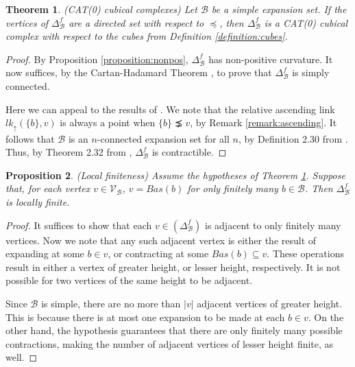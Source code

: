 \documentclass{amsart}
\newtheorem{theorem}{Theorem}[section]
\newtheorem{proposition}[theorem]{Proposition}
\newtheorem{standing assumption}[theorem]{Standing Assumption}
\begin{document}
\begin{theorem} \label{theorem:main} (CAT(0) cubical complexes)
Let $\mathcal{B}$ be a simple expansion set. If the vertices of $\Delta^{f}_{\mathcal{B}}$
are a directed set with respect to $\preceq$, then $\Delta^{f}_{\mathcal{B}}$ is 
a CAT(0) cubical complex with respect to the cubes from Definition \ref{definition:cubes}.
\end{theorem}

\begin{proof}
By Proposition \ref{proposition:nonpos}, $\Delta^{f}_{\mathcal{B}}$ has non-positive curvature.
It now suffices, by the Cartan-Hadamard Theorem \cite{BH}, to prove that $\Delta^{f}_{\mathcal{B}}$
is simply connected. 

Here we can appeal to the results of \cite{Farley}. We note that the relative ascending link
$lk_{\uparrow}(\{ b \}, v)$ is always a point when $\{ b \} \precneq v$, by Remark \ref{remark:ascending}.
It follows that $\mathcal{B}$ is an $n$-connected expansion set for all $n$, by Definition 2.30 from \cite{Farley}. Thus, by Theorem 2.32 from \cite{Farley}, $\Delta^{f}_{\mathcal{B}}$ is contractible.
\end{proof}

\begin{proposition} (Local finiteness)
\label{proposition:localfin}
Assume the hypotheses of Theorem \ref{theorem:main}. Suppose that, for each 
vertex $v \in \mathcal{V}_{\mathcal{B}}$, $v = Bas(b)$ for only finitely many $b \in \mathcal{B}$.
Then $\Delta^{f}_{\mathcal{B}}$ is locally finite.
\end{proposition}

\begin{proof}
It suffices to show that each $v \in \left( \Delta^{f}_{\mathcal{B}} \right)$ is adjacent to only finitely many vertices. Now we note that any such adjacent vertex is either the result of expanding 
at some $b \in v$, or contracting at some $Bas(b) \subseteq v$. These operations result in 
either a vertex of greater height, or lesser height, respectively. It is not possible for two vertices of the same height to be adjacent.

Since $\mathcal{B}$ is simple, there are no more than $|v|$ adjacent vertices of greater height. This is because there is at most one expansion to be made at each $b \in v$. On the other hand, the hypothesis guarantees that there are only finitely many possible contractions, making  the number of adjacent vertices of lesser height finite, as well.

\end{proof}
\end{document}

